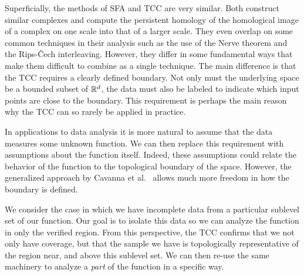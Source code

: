 Superficially, the methods of SFA and TCC are very similar.
Both construct similar complexes and compute the persistent homology of the homological image of a complex on one scale into that of a larger scale.
They even overlap on some common techniques in their analysis such as the use of the Nerve theorem and the Rips-\v{C}ech interleaving.
However, they differ in some fundamental ways that make them difficult to combine as a single technique.
The main difference is that the TCC requires a clearly defined boundary.
Not only must the underlying space be a bounded subset of $\mathbb{R}^d$, the data must also be labeled to indicate which input points are close to the boundary.
This requirement is perhaps the main reason why the TCC can so rarely be applied in practice.

In applications to data analysis it is more natural to assume that the data measures some unknown function.
We can then replace this requirement with assumptions about the function itself.
Indeed, these assumptions could relate the behavior of the function to the topological boundary of the space.
However, the generalized approach by Cavanna et al.~\cite{cavanna2017when} allows much more freedom in how the boundary is defined.

We consider the case in which we have incomplete data from a particular sublevel set of our function.
Our goal is to isolate this data so we can analyze the function in only the verified region.
From this perspective, the TCC confirms that we not only have coverage, but that the sample we have is topologically representative of the region near, and above this sublevel set.
We can then re-use the same machinery to analyze a \emph{part} of the function in a specific way.
